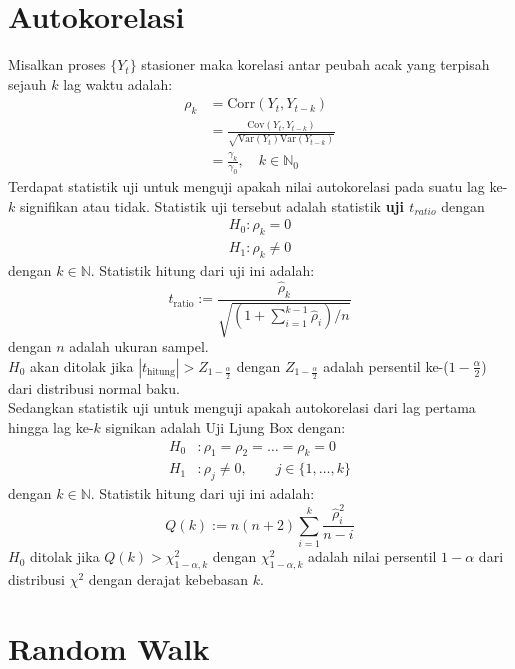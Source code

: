 \documentclass[
]{book}
\begin{document}
\hypertarget{autokorelasi}{%
\section{Autokorelasi}\label{autokorelasi}}

Misalkan proses \(\{Y_t\}\) stasioner maka korelasi antar peubah acak yang terpisah sejauh \(k\) lag waktu adalah:
\begin{align*}
\rho_k &= \text{Corr}(Y_t, Y_{t-k}) \\
&= \frac{\text{Cov}(Y_t, Y_{t-k})}{\sqrt{\text{Var}(Y_t)\text{Var}(Y_{t-k})}} \\
&= \frac{\gamma_k}{\gamma_0}, \quad k \in \mathbb{N}_0
\end{align*}
Terdapat statistik uji untuk menguji apakah nilai autokorelasi pada suatu lag ke-\(k\) signifikan atau tidak. Statistik uji tersebut adalah statistik \textbf{uji \(t_{ratio}\)} dengan
\begin{align*}
H_0 : \rho_k = 0 \\
H_1 : \rho_k \neq 0 
\end{align*}
dengan \(k \in \mathbb{N}\). Statistik hitung dari uji ini adalah:
\begin{equation}
t_{\text{ratio}} := \frac{\hat{\rho}_k}{\sqrt{\left( 1 + \sum_{i = 1}^{k - 1} \hat{\rho}_i\right)/n}}
\end{equation}
dengan \(n\) adalah ukuran sampel.\\
\(H_0\) akan ditolak jika \(|t_{\text{hitung}}| > Z_{1-\frac{\alpha}{2}}\) dengan \(Z_{1-\frac{\alpha}{2}}\) adalah persentil ke-(\(1-\frac{\alpha}{2}\)) dari distribusi normal baku.\\
Sedangkan statistik uji untuk menguji apakah autokorelasi dari lag pertama hingga lag ke-\(k\) signikan adalah Uji Ljung Box dengan:
\begin{align*}
H_0 &: \rho_1 = \rho_2 = \dots = \rho_k = 0 \\
H_1 &: \rho_j \neq 0, \quad \quad j \in \{1, \dots, k \} 
\end{align*}
dengan \(k \in \mathbb{N}\). Statistik hitung dari uji ini adalah:
\begin{equation}
Q(k) := n\left(n+2\right)\sum_{i=1}^k \frac{\hat{\rho}_i^2}{n-i}
\end{equation}
\(H_0\) ditolak jika \(Q(k) > \chi^2_{1-\alpha,k}\) dengan \(\chi^2_{1-\alpha,k}\) adalah nilai persentil \(1-\alpha\) dari distribusi \(\chi^2\) dengan derajat kebebasan \(k\).

\hypertarget{random-walk}{%
\section{Random Walk}\label{random-walk}}
\end{document}
